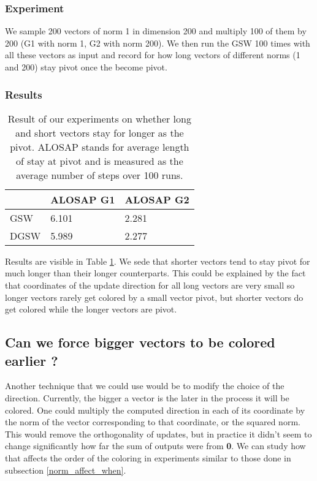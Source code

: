 \documentclass[12pt]{article}
\begin{document}
\subsubsection{Experiment}
We sample 200 vectors of norm 1 in dimension 200 and multiply 100 of them by 200 (G1 with norm 1, G2 with norm 200). We then run the GSW 100 times with all these vectors as input and record for how long vectors of different norms (1 and 200) stay pivot once the become pivot.
\subsubsection{Results}
\begin{center}
\begin{table}[h]
\begin{tabular}{l|ll}
 &ALOSAP G1&ALOSAP G2\\
\hline
GSW&6.101&2.281\\
DGSW&5.989&2.277
\end{tabular}
\caption{Result of our experiments on whether long and short vectors stay for longer as the pivot. ALOSAP stands for average length of stay at pivot and is measured as the average number of steps over 100 runs.}
\label{pivot_longer}
\end{table}
\end{center}
Results are visible in Table \ref{pivot_longer}. We sede that shorter vectors tend to stay pivot for much longer than their longer counterparts. This could be explained by the fact that coordinates of the update direction for all long vectors are very small so longer vectors rarely get colored by a small vector pivot, but shorter vectors do get colored while the longer vectors are pivot.

\subsection{Can we force bigger vectors to be colored earlier ?}
Another technique that we could use would be to modify the choice of the direction. Currently, the bigger a vector is the later in the process it will be colored. One could multiply the computed direction in each of its coordinate by the norm of the vector corresponding to that coordinate, or the squared norm. %
This would remove the orthogonality of updates, but in practice it didn't seem to change significantly how far the sum of outputs were from \textbf{0}. We can study how that affects the order of the coloring in experiments similar to those done in subsection \ref{norm_affect_when}.
\end{document}
